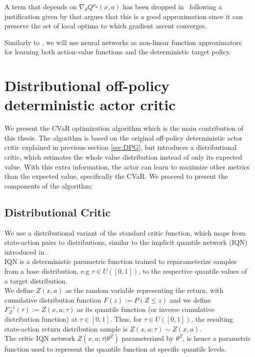 A term that depends on $\nabla_\theta Q^{\mu_\theta}(x,a) $ has been dropped in \, following a justification
given by \cite{Degris2012} that argues that this is a good approximation since it can
preserve the set of local optima to which gradient ascent converges.


Similarly to \cite{Lillicrap2016}, we will use neural networks as non-linear function approximators
for learning both action-value functions and the deterministic target policy.





\section{Distributional off-policy deterministic actor critic}
We present the CVaR optimization algorithm which is the main contribution of this thesis.
The algorithm is based on the original off-policy deterministic actor critic explained
in previous section \ref{sec:DPG}, but introduces a distributional
critic, which estimates the whole value distribution instead of only its expected value.
With this extra information, the actor can learn to maximize other metrics than the expected value,
specifically the CVaR.
We proceed to present the components of the algorithm:


\subsection{Distributional Critic}
We use a distributional variant of the standard critic function,
which maps from state-action pairs to distributions, similar
to the implicit quantile network (IQN) introduced in \cite{Dabney2018b}.\\
IQN is a deterministic parametric function trained to reparameterize samples from a
base distribution, e.g $\tau \in U([0,1])$, to the respective
quantile values of a target distribution.\\
We define $Z(x,a)$ as the random variable representing the return, with cumulative 
distribution function $F(z):=P(Z\leq z)$ and we define $F^{-1}_Z(\tau):=Z(x,a;\tau)$ as its quantile function 
(or inverse cumulative distribution function)
at $\tau \in [0,1]$.
Thus, for $\tau \in U([0,1])$, the resulting state-action return distribution sample is
$Z(x,a;\tau)\sim Z(x,a)$.\\
The critic IQN network $Z(x,a;\tau| \theta^Z)$ parameterized by $\theta^Z$,  is hence a parametric function
used to represent the quantile function at specific quantile levels.


